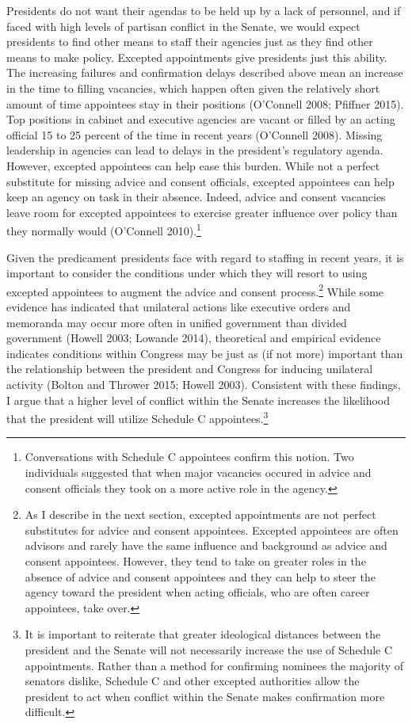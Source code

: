 \documentclass[12pt]{article}
\begin{document}
Presidents do not want their agendas to be held up by a lack of personnel, and if faced with high levels of partisan conflict in the Senate, we would expect presidents to find other means to staff their agencies just as they find other means to make policy. Excepted appointments give presidents just this ability. The increasing failures and confirmation delays described above mean an increase in the time to filling vacancies, which happen often given the relatively short amount of time appointees stay in their positions (O'Connell 2008; Pfiffner 2015). Top positions in cabinet and executive agencies are vacant or filled by an acting official 15 to 25 percent of the time in recent years (O'Connell 2008). Missing leadership in agencies can lead to delays in the president's regulatory agenda. However, excepted appointees can help ease this burden. While not a perfect substitute for missing advice and consent officials, excepted appointees can help keep an agency on task in their absence. Indeed, advice and consent vacancies leave room for excepted appointees to exercise greater influence over policy than they normally would (O'Connell 2010).\footnote{Conversations with Schedule C appointees confirm this notion. Two individuals suggested that when major vacancies occured in advice and consent officials they took on a more active role in the agency.}

Given the predicament presidents face with regard to staffing in recent years, it is important to consider the conditions under which they will resort to using excepted appointees to augment the advice and consent process.\footnote{As I describe in the next section, excepted appointments are not perfect substitutes for advice and consent appointees. Excepted appointees are often advisors and rarely have the same influence and background as advice and consent appointees. However, they tend to take on greater roles in the absence of advice and consent appointees and they can help to steer the agency toward the president when acting officials, who are often career appointees, take over.} While some evidence has indicated that unilateral actions like executive orders and memoranda may occur more often in unified government than divided government (Howell 2003; Lowande 2014), theoretical and empirical evidence indicates conditions within Congress may be just as (if not more) important than the relationship between the president and Congress for inducing unilateral activity (Bolton and Thrower 2015; Howell 2003). Consistent with these findings, I argue that a higher level of conflict within the Senate increases the likelihood that the president will utilize Schedule C appointees.\footnote{It is important to reiterate that greater ideological distances between the president and the Senate will not necessarily increase the use of Schedule C appointments. Rather than a method for confirming nominees the majority of senators dislike, Schedule C and other excepted authorities allow the president to act when conflict within the Senate makes confirmation more difficult.} 
\end{document}
